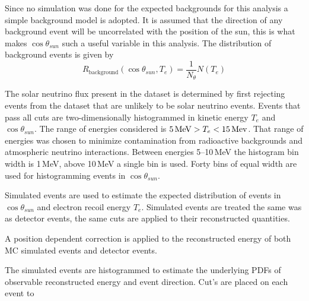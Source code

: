 Since no simulation was done for the expected backgrounds for this analysis
a simple background model is adopted.
It is assumed that the direction of any background event will be uncorrelated
with the position of the sun, this is what makes $\cos\theta_{sun}$ such a
useful variable in this analysis.
The distribution of background events is given by
\begin{equation}
    R_{\mathrm{background}}(\cos\theta_{sun}, T_{e}) = \frac{1}{N_\theta}N(T_{e})
\end{equation}

The solar neutrino flux present in the dataset is determined by first
rejecting events from the dataset that are unlikely to be solar neutrino events.
Events that pass all cuts are two-dimensionally histogrammed in kinetic energy $T_{e}$ and
$\cos\theta_{sun}$.
The range of energies considered is $5\text{\,MeV} > T_{e} < 15\text{\,Mev}$.
That range of energies was chosen to minimize contamination from radioactive
backgrounds and atmospheric neutrino interactions.
Between energies \numrange{5}{10}\,MeV the histogram bin width
is 1\,MeV, above 10\,MeV a single bin is used.
Forty bins of equal width are used for histogramming events in $\cos\theta_{sun}$.

Simulated events are used to estimate the expected distribution of events in
$\cos\theta_{sun}$ and electron recoil energy $T_{e}$.
Simulated events are treated the same was as detector events, the same
cuts are applied to their reconstructed quantities.

A position dependent correction is applied to the reconstructed energy
of both MC simulated events and detector events.

The simulated events are histogrammed to estimate the underlying PDFs
of observable reconstructed energy and event direction. Cut's are placed
on each event to
